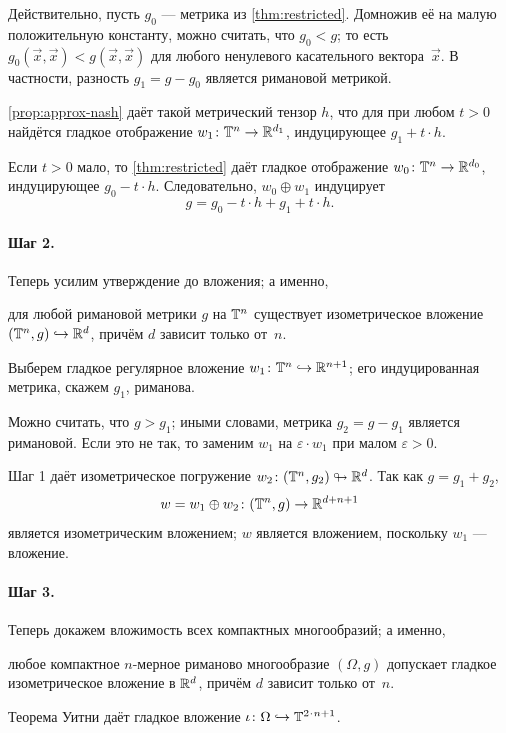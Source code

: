 Действительно, пусть $g_0$ --- метрика из \ref{thm:restricted}.
Домножив её на малую положительную константу, можно считать, что $g_0<g$; то есть $g_0(\vec x,\vec x)<g(\vec x,\vec x)$ для любого ненулевого касательного вектора~$\vec x$.
В частности, разность $g_1=g-g_0$ является римановой метрикой.

\ref{prop:approx-nash} даёт такой метрический тензор $h$, что для при любом $t>0$ найдётся гладкое отображение $w_1\colon\mathbb{T}^n\to \mathbb{R}^{d_1}$, индуцирующее $g_1+t\cdot h$.

Если $t>0$ мало, то \ref{thm:restricted} даёт гладкое отображение $w_0\colon\TT^n\z\to \RR^{d_0}$, индуцирующее $g_0-t \cdot h$.
Следовательно, $w_0\oplus w_1$ индуцирует
\[g=g_0-t\cdot h+g_1+t\cdot h.\]

\paragraph{Шаг 2.}
Теперь усилим утверждение до вложения; а именно,
\begin{clm}{}
для любой римановой метрики $g$ на $\mathbb{T}^n$ существует изометрическое вложение $(\mathbb{T}^n,g)\hookrightarrow\mathbb{R}^d$, причём $d$ зависит только от~$n$.
\end{clm}

Выберем гладкое регулярное вложение $w_1\colon\mathbb{T}^n\hookrightarrow \mathbb{R}^{n+1}$;
его индуцированная метрика, скажем $g_1$, риманова.

Можно считать, что $g>g_1$; иными словами, метрика $g_2=g-g_1$ является римановой.
Если это не так, то заменим $w_1$ на $\varepsilon \cdot w_1$ при малом $\varepsilon > 0$.

Шаг 1 даёт изометрическое погружение $w_2\colon(\TT^n,g_2)\z\looparrowright \RR^d$.
Так как $g=g_1+g_2$,
\[w=w_1\oplus w_2\colon (\mathbb{T}^n,g)\to \mathbb{R}^{d+ n+1}\]
является изометрическим вложением; $w$ является вложением, поскольку $w_1$ --- вложение.

\paragraph{Шаг 3.}
Теперь докажем вложимость всех компактных многообразий; а именно,
\begin{clm}{}
любое компактное $n$-мерное риманово многообразие $(\Omega,g)$ допускает гладкое изометрическое вложение в $\mathbb{R}^d$, причём $d$ зависит только от~$n$.
\end{clm}

Теорема Уитни даёт гладкое вложение $\iota\colon\Omega\hookrightarrow\TT^{2\cdot n+1}$.

